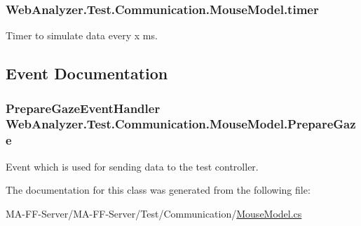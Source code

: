 \subsubsection[{timer}]{ Web\+Analyzer.\+Test.\+Communication.\+Mouse\+Model.\+timer\hspace{0.3cm}{\ttfamily [private]}}\label{class_web_analyzer_1_1_test_1_1_communication_1_1_mouse_model_a23daaf5b022d16c45c6f9d0084da2819}


Timer to simulate data every x ms. 



\subsection{Event Documentation}
\hypertarget{class_web_analyzer_1_1_test_1_1_communication_1_1_mouse_model_ad799e6cf6032401ee7d8b1706d7c8a20}{}
\subsubsection[{Prepare\+Gaze}]{\setlength{\rightskip}{0pt plus 5cm}Prepare\+Gaze\+Event\+Handler Web\+Analyzer.\+Test.\+Communication.\+Mouse\+Model.\+Prepare\+Gaze}\label{class_web_analyzer_1_1_test_1_1_communication_1_1_mouse_model_ad799e6cf6032401ee7d8b1706d7c8a20}


Event which is used for sending data to the test controller. 



The documentation for this class was generated from the following file\+:\begin{DoxyCompactItemize}
\item 
M\+A-\/\+F\+F-\/\+Server/\+M\+A-\/\+F\+F-\/\+Server/\+Test/\+Communication/\hyperlink{_mouse_model_8cs}{Mouse\+Model.\+cs}\end{DoxyCompactItemize}
